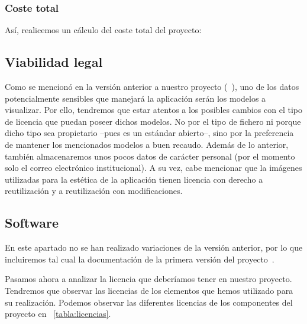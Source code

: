 \subsubsection{Coste total}
Así, realicemos un cálculo del coste total del proyecto:

\subsection{Viabilidad legal}
Como se mencionó en la versión anterior a nuestro proyecto (~\cite{github:alberto-viewer}), uno de los datos potencialmente sensibles que manejará la aplicación serán los modelos a visualizar. Por ello, tendremos que estar atentos a los posibles cambios con el tipo de licencia que puedan poseer dichos modelos. No por el tipo de fichero ni porque dicho tipo sea propietario --pues es un estándar abierto--, sino por la preferencia de mantener los mencionados modelos a buen recaudo. Además de lo anterior, también almacenaremos unos pocos datos de carácter personal (por el momento solo el correo electrónico institucional).
A su vez, cabe mencionar que la imágenes utilizadas para la estética de la aplicación tienen licencia con derecho a reutilización y a reutilización con modificaciones.

\subsection{Software}
En este apartado no se han realizado variaciones de la versión anterior, por lo que incluiremos tal cual la documentación de la primera versión del proyecto~\cite{github:alberto-viewer}.

Pasamos ahora a analizar la licencia que deberíamos tener en nuestro proyecto. Tendremos que observar las licencias de los elementos que hemos utilizado para su realización.
Podemos observar las diferentes licencias de los componentes del proyecto en ~\ref{tabla:licencias}.

